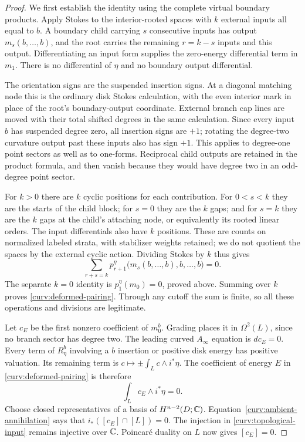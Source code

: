 \begin{proof}
We first establish the identity using the complete virtual boundary
products.  Apply Stokes to the interior-rooted spaces with $k$
external inputs all equal to $b$.  A boundary child carrying $s$
consecutive inputs has output $m_s(b,\ldots,b)$, and the root carries
the remaining $r=k-s$ inputs and this output.  Differentiating an
input form supplies the zero-energy differential term in $m_1$.
There is no differential of $\eta$ and no boundary output
differential.

The orientation signs are the suspended insertion signs.  At a
diagonal matching node this is the ordinary disk Stokes calculation,
with the even interior mark in place of the root's boundary-output
coordinate.  External branch cap lines are moved with their total
shifted degrees in the same calculation.  Since every input $b$
has suspended degree zero, all insertion signs are $+1$; rotating
the degree-two curvature output past these inputs also has sign
$+1$.  This applies to degree-one point sectors as well as to
one-forms.  Reciprocal child outputs are retained in the product
formula, and then vanish because they would have degree two in an
odd-degree point sector.

For $k>0$ there are $k$ cyclic positions for each contribution.
For $0<s<k$ they are the starts of the child block; for $s=0$ they
are the $k$ gaps; and for $s=k$ they are the $k$ gaps at the child's
attaching node, or equivalently its rooted linear orders.  The
input differentials also have $k$ positions.  These are counts on
normalized labeled strata, with stabilizer weights retained; we
do not quotient the spaces by the external cyclic action.
Dividing Stokes by $k$ thus gives
\[
 \sum_{r+s=k}
 p_{r+1}^\eta\bigl(m_s(b,\ldots,b),b,\ldots,b\bigr)=0.
\]
The separate $k=0$ identity is $p_1^\eta(m_0)=0$, proved above.
Summing over $k$ proves \eqref{curv:deformed-pairing}.  Through any
cutoff the sum is finite, so all these operations and divisions are
legitimate.

Let $c_E$ be the first nonzero coefficient of $m_0^b$.  Grading
places it in $\Omega^2(L)$, since no branch sector has degree two.
The leading curved $A_\infty$ equation is $dc_E=0$.  Every term
of $R_\eta^b$ involving a $b$ insertion or positive disk energy has
positive valuation.  Its remaining term is
$c\mapsto\pm\int_L c\wedge i^*\eta$.  The coefficient of energy
$E$ in \eqref{curv:deformed-pairing} is therefore
\begin{equation}\label{curv:ambient-annihilation}
 \int_L c_E\wedge i^*\eta=0.
\end{equation}
Choose closed representatives of a basis of $H^{n-2}(D;\mathbb C)$.
Equation~\eqref{curv:ambient-annihilation} says that
$i_*([c_E]\cap[L])=0$.  The injection in
\eqref{curv:topological-input} remains injective over $\mathbb C$.
Poincar\'e duality on $L$ now gives $[c_E]=0$.
\end{proof}

